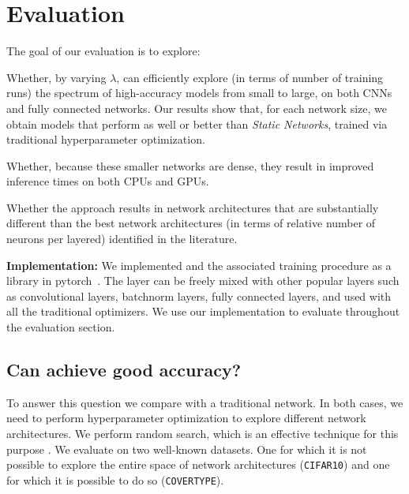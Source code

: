 \section{Evaluation}

The goal of our evaluation is to explore:

\begin{compactitem}
\item Whether, by varying $\lambda$, \shrink can efficiently
explore (in terms of number of training runs)  the spectrum of high-accuracy
models from small to large, on both CNNs and fully connected networks.  Our
results show that, for each network size, we obtain models that perform as well
or better than \textit{Static Networks}, trained via traditional hyperparameter
optimization.

\item Whether, because these  smaller networks are dense, they result in
improved inference times on both CPUs and GPUs.

\item Whether the \shrink approach results in network architectures that are
substantially different than the best network architectures (in terms of
relative number of neurons per layered) identified in the literature.

\end{compactitem}

\noindent\textbf{Implementation: }We implemented \swls and
the associated training procedure as a library in
pytorch~\cite{paszke2017automatic}. The layer can be freely mixed with other
popular layers such as convolutional layers, batchnorm layers, fully connected
layers, and used with all the traditional optimizers. We use our implementation
to evaluate \shrink throughout the evaluation section.

\subsection{Can \shrink achieve good accuracy?}

To answer this question we compare \shrink with a traditional network. In
both cases, we need to perform hyperparameter optimization to explore different
network architectures. We perform random search, which is an effective technique
for this purpose \cite{BergstraJAMESBERGSTRA2012}. We evaluate \shrink on two well-known datasets. One
for which it is not possible to explore the entire space of network
architectures (\texttt{CIFAR10}) and one for which it is possible to do so
(\texttt{COVERTYPE}).

